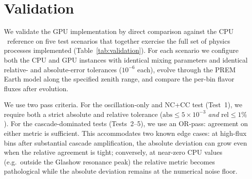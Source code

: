 \section{Validation}
\label{sec:validation}

We validate the GPU implementation by direct comparison against the
CPU \nusquids\ reference on five test scenarios that together exercise
the full set of physics processes implemented (Table~\ref{tab:validation}).
For each scenario we configure both the CPU and GPU instances with
identical mixing parameters and identical relative- and absolute-error
tolerances ($10^{-6}$ each), evolve through the PREM Earth model
along the specified zenith range, and compare the per-bin flavor
fluxes after evolution.

We use two pass criteria. For the oscillation-only and NC+CC test
(Test~1), we require both a strict absolute and relative tolerance
($\mathrm{abs} \le 5\times 10^{-3}$ \emph{and} $\mathrm{rel} \le 1\%$).
For the cascade-dominated tests (Tests~2--5), we use an OR-pass:
agreement on either metric is sufficient. This accommodates two
known edge cases: at high-flux bins after substantial cascade
amplification, the absolute deviation can grow even when the relative
agreement is tight; conversely, at near-zero CPU values (e.g.\ outside
the Glashow resonance peak) the relative metric becomes pathological
while the absolute deviation remains at the numerical noise floor.

